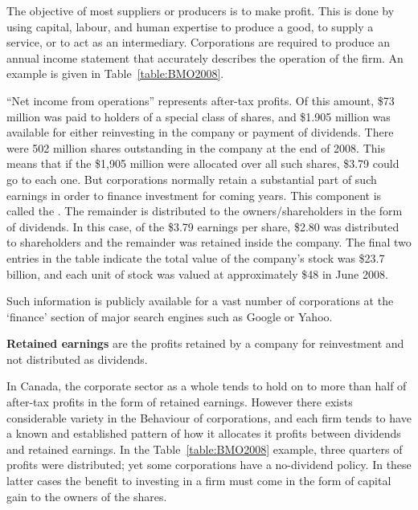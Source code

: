 The objective of most suppliers or producers is to make profit. This is done by using capital, labour, and human expertise to produce a good, to supply a service, or to act as an intermediary. Corporations are required to produce an annual income statement that accurately describes the operation of the firm. An example is given in Table~\ref{table:BMO2008}.

``Net income from operations'' represents after-tax profits. Of this amount, \$73 million was paid to holders of a special class of shares, and \$1.905 million was available for either reinvesting in the company or payment of dividends. There were 502 million shares outstanding in the company at the end of 2008. This means that if the \$1,905 million were allocated over all such shares, \$3.79 could go to each one. But corporations normally retain a substantial part of such earnings in order to finance investment for coming years. This component is called the . The remainder is distributed to the owners/shareholders in the form of dividends. In this case, of the \$3.79 earnings per share, \$2.80 was distributed to shareholders and the remainder was retained inside the company. The final two entries in the table indicate the total value of the company's stock was \$23.7 billion, and each unit of stock was valued at approximately \$48 in June 2008. 

Such information is publicly available for a vast number of corporations at the `finance' section of major search engines such as Google or Yahoo.

\begin{DefBox}
\textbf{Retained earnings} are the profits retained by a company for reinvestment and not distributed as dividends.
\end{DefBox}

In Canada, the corporate sector as a whole tends to hold on to more than half of after-tax profits in the form of retained earnings. However there exists considerable variety in the Behaviour of corporations, and each firm tends to have a known and established pattern of how it allocates it profits between dividends and retained earnings. In the Table~\ref{table:BMO2008} example, three quarters of profits were distributed; yet some corporations have a no-dividend policy. In these latter cases the benefit to investing in a firm must come in the form of capital gain to the owners of the shares.